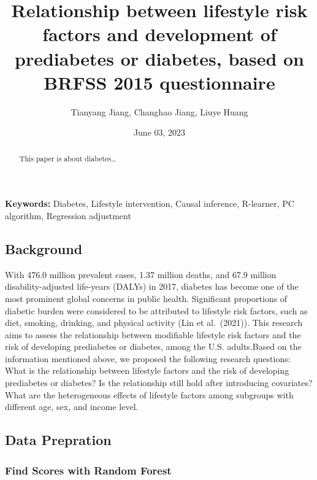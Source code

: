 \documentclass[
  12pt,
]{article}
\title{Relationship between lifestyle risk factors and development of
prediabetes or diabetes, based on BRFSS 2015 questionnaire}
\author{Tianyang Jiang, Changhao Jiang, Liuye Huang}
\date{June 03, 2023}
\begin{document}
\maketitle
\begin{abstract}
This paper is about diabetes\ldots{}
\end{abstract}

\textbf{Keywords:} Diabetes, Lifestyle intervention, Causal inference,
R-learner, PC algorithm, Regression adjustment

\hypertarget{background}{%
\subsection{Background}\label{background}}

With 476.0 million prevalent cases, 1.37 million deaths, and 67.9
million disability-adjusted life-years (DALYs) in 2017, diabetes has
become one of the most prominent global concerns in public health.
Significant proportions of diabetic burden were considered to be
attributed to lifestyle risk factors, such as diet, smoking, drinking,
and physical activity (Lin et al.~(2021)). This research aims to assess
the relationship between modifiable lifestyle risk factors and the risk
of developing prediabetes or diabetes, among the U.S. adults.Based on
the information mentioned above, we proposed the following research
questions: What is the relationship between lifestyle factors and the
risk of developing prediabetes or diabetes? Is the relationship still
hold after introducing covariates? What are the heterogeneous effects of
lifestyle factors among subgroups with different age, sex, and income
level.

\hypertarget{data-prepration}{%
\subsection{Data Prepration}\label{data-prepration}}

\hypertarget{find-scores-with-random-forest}{%
\subsubsection{Find Scores with Random
Forest}\label{find-scores-with-random-forest}}
\end{document}
